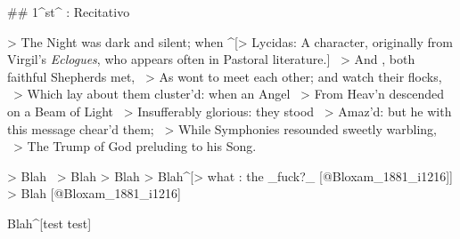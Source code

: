 ## 1^st^ \mvmt: Recitativo


> The Night was dark and silent; when ^[> Lycidas: A character, originally from Virgil's \textit{Eclogues}, who appears often in Pastoral literature.] \
> And , both faithful Shepherds met,  \
> As wont to meet each other; and watch their flocks,  \
> Which lay about them cluster’d: when an Angel  \
> From Heav’n descended on a Beam of Light  \
> Insufferably glorious: they stood  \
> Amaz’d: but he with this message chear’d them;  \
> While Symphonies resounded sweetly warbling,  \
> The Trump of God preluding to his Song.

> Blah \
> Blah
> Blah
> Blah^[> what : the _fuck?_ [@Bloxam_1881_i1216]]
> Blah [@Bloxam_1881_i1216]


Blah^[test test]
